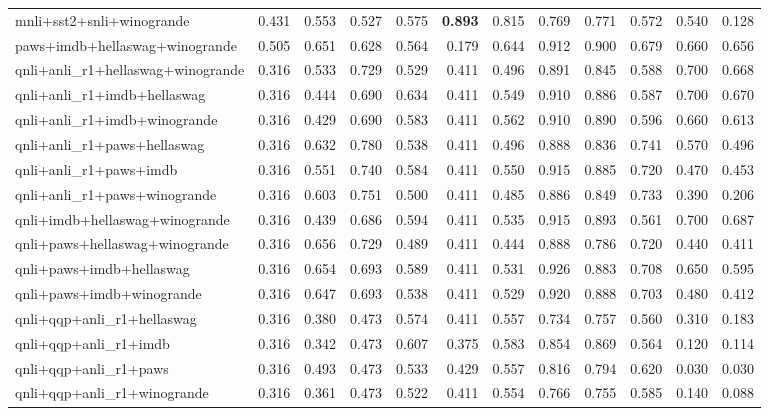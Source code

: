 \begin{table}[t]
\begin{tabular}{lrrrrrrrrrrr}
    mnli+sst2+snli+winogrande & 0.431 & 0.553 & 0.527 & 0.575 & \textbf{0.893} & 0.815 & 0.769 & 0.771 & 0.572 & 0.540 & 0.128 \\
    paws+imdb+hellaswag+winogrande & 0.505 & 0.651 & 0.628 & 0.564 & 0.179 & 0.644 & 0.912 & 0.900 & 0.679 & 0.660 & 0.656 \\
    qnli+anli\_r1+hellaswag+winogrande & 0.316 & 0.533 & 0.729 & 0.529 & 0.411 & 0.496 & 0.891 & 0.845 & 0.588 & 0.700 & 0.668 \\
    qnli+anli\_r1+imdb+hellaswag & 0.316 & 0.444 & 0.690 & 0.634 & 0.411 & 0.549 & 0.910 & 0.886 & 0.587 & 0.700 & 0.670 \\
    qnli+anli\_r1+imdb+winogrande & 0.316 & 0.429 & 0.690 & 0.583 & 0.411 & 0.562 & 0.910 & 0.890 & 0.596 & 0.660 & 0.613 \\
    qnli+anli\_r1+paws+hellaswag & 0.316 & 0.632 & 0.780 & 0.538 & 0.411 & 0.496 & 0.888 & 0.836 & 0.741 & 0.570 & 0.496 \\
    qnli+anli\_r1+paws+imdb & 0.316 & 0.551 & 0.740 & 0.584 & 0.411 & 0.550 & 0.915 & 0.885 & 0.720 & 0.470 & 0.453 \\
    qnli+anli\_r1+paws+winogrande & 0.316 & 0.603 & 0.751 & 0.500 & 0.411 & 0.485 & 0.886 & 0.849 & 0.733 & 0.390 & 0.206 \\
    qnli+imdb+hellaswag+winogrande & 0.316 & 0.439 & 0.686 & 0.594 & 0.411 & 0.535 & 0.915 & 0.893 & 0.561 & 0.700 & 0.687 \\
    qnli+paws+hellaswag+winogrande & 0.316 & 0.656 & 0.729 & 0.489 & 0.411 & 0.444 & 0.888 & 0.786 & 0.720 & 0.440 & 0.411 \\
    qnli+paws+imdb+hellaswag & 0.316 & 0.654 & 0.693 & 0.589 & 0.411 & 0.531 & 0.926 & 0.883 & 0.708 & 0.650 & 0.595 \\
    qnli+paws+imdb+winogrande & 0.316 & 0.647 & 0.693 & 0.538 & 0.411 & 0.529 & 0.920 & 0.888 & 0.703 & 0.480 & 0.412 \\
    qnli+qqp+anli\_r1+hellaswag & 0.316 & 0.380 & 0.473 & 0.574 & 0.411 & 0.557 & 0.734 & 0.757 & 0.560 & 0.310 & 0.183 \\
    qnli+qqp+anli\_r1+imdb & 0.316 & 0.342 & 0.473 & 0.607 & 0.375 & 0.583 & 0.854 & 0.869 & 0.564 & 0.120 & 0.114 \\
    qnli+qqp+anli\_r1+paws & 0.316 & 0.493 & 0.473 & 0.533 & 0.429 & 0.557 & 0.816 & 0.794 & 0.620 & 0.030 & 0.030 \\
    qnli+qqp+anli\_r1+winogrande & 0.316 & 0.361 & 0.473 & 0.522 & 0.411 & 0.554 & 0.766 & 0.755 & 0.585 & 0.140 & 0.088 \\

\end{tabular}
\end{table}
